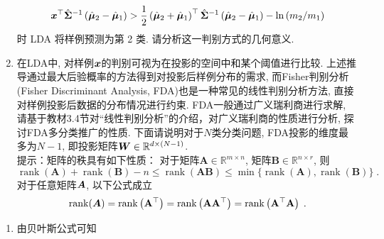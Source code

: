 \documentclass[answers]{exam}  %
\begin{document}
\begin{questions}
\begin{enumerate}
          \begin{equation}
            {\boldsymbol{x}}^{\top} \hat{\boldsymbol{\Sigma}}^{-1}\left(\hat{\boldsymbol{\mu}}_{2}-\hat{\boldsymbol{\mu}}_{1}\right)>\frac{1}{2}\left(\hat{\boldsymbol{\mu}}_{2}+\hat{\boldsymbol{\mu}}_{1}\right)^{\top} \hat{\boldsymbol{\Sigma}}^{-1}\left(\hat{\boldsymbol{\mu}}_{2}-\hat{\boldsymbol{\mu}}_{1}\right)-\ln \left(m_{2} / m_{1}\right)
          \end{equation}时 LDA 将样例预测为第 2 类. 请分析这一判别方式的几何意义.
    \item 在LDA中, 对样例${\boldsymbol{x}}$的判别可视为在投影的空间中和某个阈值进行比较. 上述推导通过最大后验概率的方法得到对投影后样例分布的需求, 而Fisher判别分析 (Fisher Discriminant Analysis, FDA)也是一种常见的线性判别分析方法, 直接对样例投影后数据的分布情况进行约束.
          FDA一般通过广义瑞利商进行求解, 请基于教材3.4节对“线性判别分析”的介绍，对广义瑞利商的性质进行分析, 探讨FDA多分类推广的性质.
          下面请说明对于$N$类分类问题, FDA投影的维度最多为$N-1$, 即投影矩阵$\boldsymbol{W}\in\mathbb{R}^{d\times (N-1)}$.\\
          提示：矩阵的秩具有如下性质：
          对于矩阵$\mathbf{A}\in\mathbb{R}^{m \times n}$, 矩阵$\mathbf{B}\in\mathbb{R}^{n \times r}$, 则
          \begin{equation}
            \operatorname{rank}(\mathbf{A})+\operatorname{rank}(\mathbf{B})-n \leq \operatorname{rank}(\mathbf{A B}) \leq \min \{\operatorname{rank}(\mathbf{A}), \operatorname{rank}(\mathbf{B})\}\;.
          \end{equation}
          对于任意矩阵$\boldsymbol{A}$, 以下公式成立
          \begin{equation}
            \operatorname{rank}(\boldsymbol{A})=\operatorname{rank}\left(\mathbf{A}^{\top}\right)=\operatorname{rank}\left(\mathbf{A} \mathbf{A}^{\top}\right)=\operatorname{rank}\left(\mathbf{A}^{\top} \mathbf{A}\right)\;.
          \end{equation}
  \end{enumerate}
  \begin{solution}
    \begin{enumerate}
      \item

            由贝叶斯公式可知


\end{enumerate}
\end{solution}
\end{questions}
\end{document}
